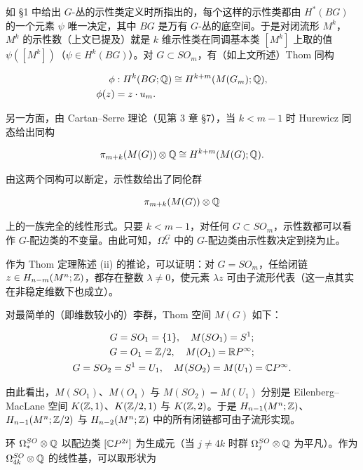 如 §1 中给出 $G$-丛的示性类定义时所指出的，每个这样的示性类都由 $H^*(BG)$ 的一个元素 $\psi$ 唯一决定，其中 $BG$ 是万有 $G$-丛的底空间。于是对闭流形 $M^k$，$M^k$ 的示性数（上文已提及）就是 $k$ 维示性类在同调基本类 $[M^k]$ 上取的值 $\psi([M^k])$（$\psi\in H^{k}(BG)$）。对 $G\subset SO_m$，有（如上文所述）Thom 同构

\begin{align}
\phi &: H^{k}(BG;\mathbb{Q})\cong H^{k+m}(M(G_m);\mathbb{Q}), \nonumber\\
\phi(z) &= z\cdot u_m .
\end{align}


另一方面，由 Cartan--Serre 理论（见第 3 章 §7），当 $k<m-1$ 时 Hurewicz 同态给出同构

\[ \pi_{m+k}(M(G))\otimes\mathbb{Q}\cong H^{k+m}(M(G);\mathbb{Q}). \]

由这两个同构可以断定，示性数给出了同伦群

\[ \pi_{m+k}(M(G))\otimes\mathbb{Q} \]

上的一族完全的线性形式。只要 $k<m-1$，对任何 $G\subset SO_m$，示性数都可以看作 $G$-配边类的不变量。由此可知，$\Omega_*^{G}$ 中的 $G$-配边类由示性数决定到挠为止。

作为 Thom 定理陈述 (ii) 的推论，可以证明：对 $G=SO_m$，任给闭链 $z\in H_{n-m}(M^n;\mathbb{Z})$，都存在整数 $\lambda\ne 0$，使元素 $\lambda z$ 可由子流形代表（这一点其实在非稳定维数下也成立）。

对最简单的（即维数较小的）李群，Thom 空间 $M(G)$ 如下：

\begin{gather*}
G=SO_1=\{1\},\quad M(SO_1)=S^1;\\
G=O_1=\mathbb{Z}/2,\quad M(O_1)=\mathbb{R}P^\infty;\\
G=SO_2=S^1=U_1,\quad M(SO_2)=M(U_1)=\mathbb{C}P^\infty.
\end{gather*}

由此看出，$M(SO_1)$、$M(O_1)$ 与 $M(SO_2)=M(U_1)$ 分别是 Eilenberg--MacLane 空间 $K(\mathbb{Z},1)$、$K(\mathbb{Z}/2,1)$ 与 $K(\mathbb{Z},2)$。于是 $H_{n-1}(M^n;\mathbb{Z})$、$H_{n-1}(M^n;\mathbb{Z}/2)$ 与 $H_{n-2}(M^n;\mathbb{Z})$ 中的所有闭链都可由子流形实现。

环 $\Omega_*^{SO}\otimes\mathbb{Q}$ 以配边类 $[\mathbb{C}P^{2i}]$ 为生成元（当 $j\ne 4k$ 时群 $\Omega_j^{SO}\otimes\mathbb{Q}$ 为平凡）。作为 $\Omega_{4k}^{SO}\otimes\mathbb{Q}$ 的线性基，可以取形状为

